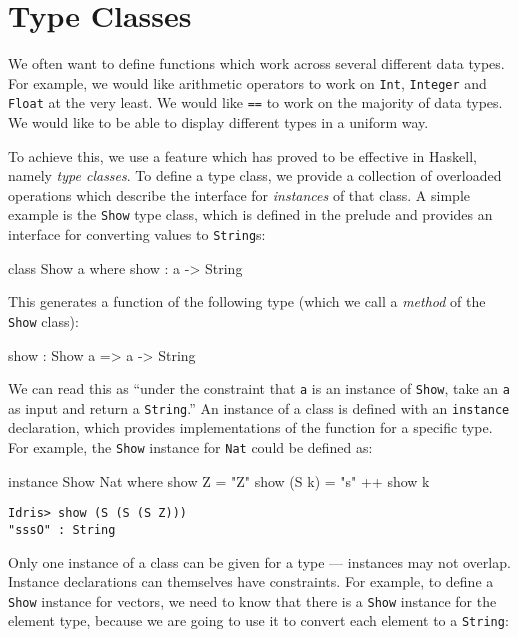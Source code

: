 \section{Type Classes}
\label{sec:classes}

We often want to define functions which work across several different data
types. For example, we would like arithmetic operators to work on \texttt{Int},
\texttt{Integer} and \texttt{Float} at the very least. We would like
\texttt{==} to work on the majority of data types. We would like to be able to
display different types in a uniform way.

To achieve this, we use a feature which has proved to be effective in Haskell, namely
\emph{type classes}. To define a type class, we provide a collection of overloaded
operations which describe the interface for \emph{instances} of that class. A simple example
is the \texttt{Show} type class, which is defined in the prelude and
provides an interface for converting values to
\texttt{String}s:

\begin{code}
class Show a where
    show : a -> String
\end{code}

\noindent
This generates a function of the following type (which we call a \emph{method} of the 
\texttt{Show} class):

\begin{code}
show : Show a => a -> String
\end{code}

\noindent
We can read this as ``under the constraint that \texttt{a} is an instance of \texttt{Show},
take an \texttt{a} as input and return a \texttt{String}.'' An instance of a class
is defined with an \texttt{instance} declaration, which provides implementations of
the function for a specific type. For example, the \texttt{Show} instance for \texttt{Nat}
could be defined as:

\begin{code}
instance Show Nat where
    show Z = "Z"
    show (S k) = "s" ++ show k
\end{code}

\begin{lstlisting}
Idris> show (S (S (S Z)))
"sssO" : String
\end{lstlisting}

\noindent
Only one instance of a class can be given for a type --- instances may not overlap.
Instance declarations can themselves have constraints. For example, to define a
\texttt{Show} instance for vectors, we need to know that there is a \texttt{Show} 
instance for the element type, because we are going to use it to convert each element
to a \texttt{String}:

